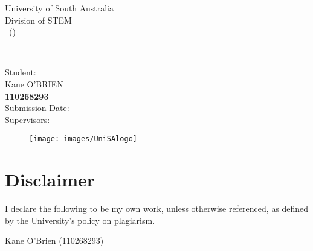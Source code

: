 \begin{titlepage}
\centering
{\Large University of South Australia\\ \vspace{1ex}Division of STEM\\ \vspace{1ex}}
{\Large \courseName \ (\textbf{\courseCode})}

{\Large \textbf{\submissionType}\\ \vfill

{\Huge \textbf{\submissionTitle}}

\par\vspace*{1\baselineskip}
{\large Student:\\}
{\Large Kane O'BRIEN\\ \textbf{110268293} \\}
\vfill
{\Large Submission Date: \dueDate \\}
\vspace*{.25\baselineskip}
{\large Supervisors:\\}
{\Large \supervisors}
\begin{figure}[b]\centering \hfill \texttt{[image: images/UniSAlogo]}\end{figure}}
\end{titlepage}
\newpage



\section*{Disclaimer}
\begin{centering}I declare the following to be my own work, unless otherwise referenced, as defined by the University's policy on plagiarism.\\
\end{centering}
\begin{flushright}Kane O'Brien (110268293)\\\vspace*{\baselineskip}\end{flushright}
\vfill
\clearpage



\tableofcontents
\clearpage
\listoffigures
\listoftables
\clearpage
